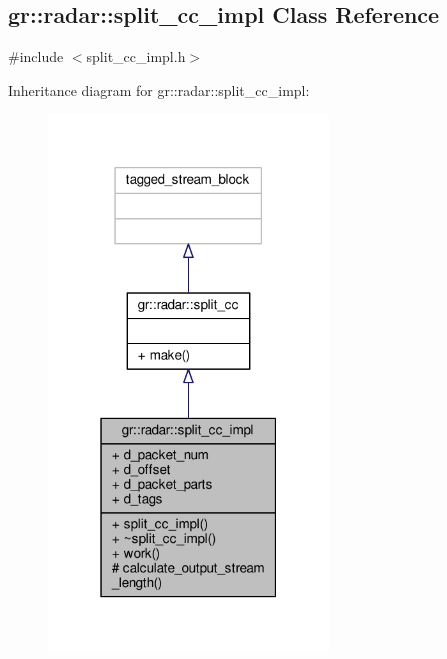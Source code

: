 \subsection{gr\+:\+:radar\+:\+:split\+\_\+cc\+\_\+impl Class Reference}
\label{classgr_1_1radar_1_1split__cc__impl}


{\ttfamily \#include $<$split\+\_\+cc\+\_\+impl.\+h$>$}



Inheritance diagram for gr\+:\+:radar\+:\+:split\+\_\+cc\+\_\+impl\+:
\nopagebreak
\begin{figure}[H]
\begin{center}
\leavevmode
\includegraphics[width=211pt]{d7/dee/classgr_1_1radar_1_1split__cc__impl__inherit__graph}
\end{center}
\end{figure}


